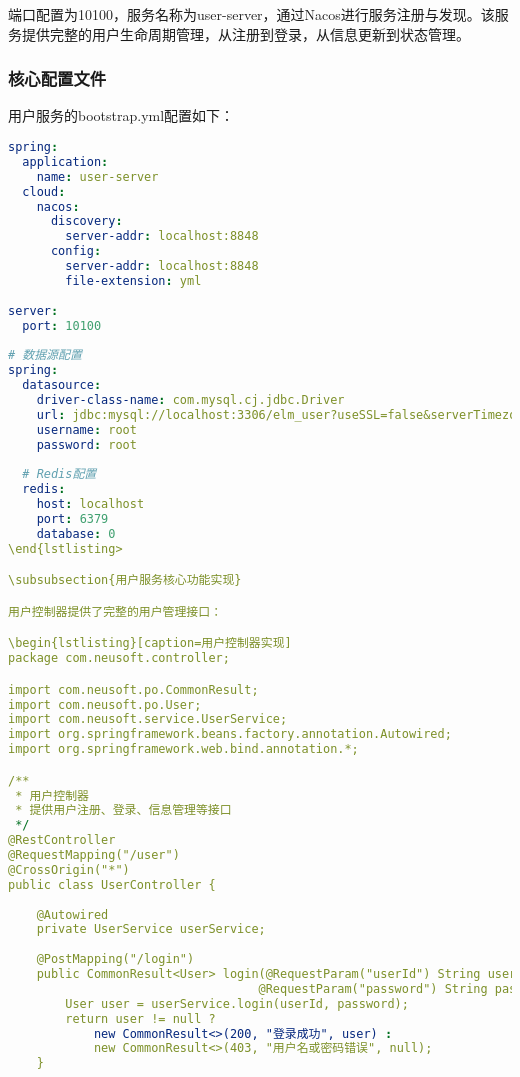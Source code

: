 \documentclass[a4paper,12pt]{article}
\begin{document}
端口配置为10100，服务名称为user-server，通过Nacos进行服务注册与发现。该服务提供完整的用户生命周期管理，从注册到登录，从信息更新到状态管理。

\subsubsection{核心配置文件}

用户服务的bootstrap.yml配置如下：

\begin{lstlisting}[caption=用户服务bootstrap.yml配置,language=YAML]
spring:
  application:
    name: user-server
  cloud:
    nacos:
      discovery:
        server-addr: localhost:8848
      config:
        server-addr: localhost:8848
        file-extension: yml
        
server:
  port: 10100
  
# 数据源配置
spring:
  datasource:
    driver-class-name: com.mysql.cj.jdbc.Driver
    url: jdbc:mysql://localhost:3306/elm_user?useSSL=false&serverTimezone=UTC
    username: root
    password: root
      
  # Redis配置
  redis:
    host: localhost
    port: 6379
    database: 0
\end{lstlisting>

\subsubsection{用户服务核心功能实现}

用户控制器提供了完整的用户管理接口：

\begin{lstlisting}[caption=用户控制器实现]
package com.neusoft.controller;

import com.neusoft.po.CommonResult;
import com.neusoft.po.User;
import com.neusoft.service.UserService;
import org.springframework.beans.factory.annotation.Autowired;
import org.springframework.web.bind.annotation.*;

/**
 * 用户控制器
 * 提供用户注册、登录、信息管理等接口
 */
@RestController
@RequestMapping("/user")
@CrossOrigin("*")
public class UserController {
    
    @Autowired
    private UserService userService;
    
    @PostMapping("/login")
    public CommonResult<User> login(@RequestParam("userId") String userId,
                                   @RequestParam("password") String password) {
        User user = userService.login(userId, password);
        return user != null ? 
            new CommonResult<>(200, "登录成功", user) : 
            new CommonResult<>(403, "用户名或密码错误", null);
    }
    

\end{lstlisting}
\end{document}
